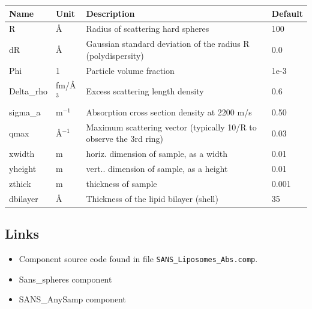 \begin{longtable}{p{}p{}p{}p{}}
\toprule
\textbf{Name} & \textbf{Unit} & \textbf{Description} & \textbf{Default} \\
\midrule
\endhead
R & \AA{} & Radius of scattering hard spheres & 100 \\
dR & \AA{} & Gaussian standard deviation of the radius R (polydispersity) & 0.0 \\
Phi & 1 & Particle volume fraction & 1e-3 \\
Delta\_rho & fm/\AA{}$^{3}$ & Excess scattering length density & 0.6 \\
sigma\_a & m$^{-1}$ & Absorption cross section density at 2200 m/s & 0.50 \\
qmax & \AA{}$^{-1}$ & Maximum scattering vector (typically 10/R to observe the 3rd ring) & 0.03 \\
xwidth & m & horiz. dimension of sample, as a width & 0.01 \\
yheight & m & vert.. dimension of sample, as a height & 0.01 \\
zthick & m & thickness of sample & 0.001 \\
dbilayer & \AA{} & Thickness of the lipid bilayer (shell) & 35 \\
\bottomrule
\end{longtable}

\subsection*{Links}
\begin{itemize}
  \item Component source code found in file \texttt{SANS\_Liposomes\_Abs.comp}.
  \item Sans\_spheres component
  \item SANS\_AnySamp component
\end{itemize}
